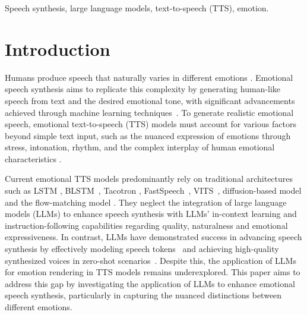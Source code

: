 \begin{IEEEkeywords}
Speech synthesis, large language models, text-to-speech (TTS), emotion.
\end{IEEEkeywords}
\vspace{-0.3cm}
\section{Introduction}
\vspace{-0.1cm}
Humans produce speech that naturally varies in different emotions \cite{yasuda2023text,chen2023vector,khanam2022text,nose2007style}.
Emotional speech synthesis aims to replicate this complexity by generating human-like speech from text and the desired emotional tone, with significant advancements achieved through machine learning techniques~\cite{zhou2022speech,diatlova2023emospeech,lee2017emotional,li2024mm}.
To generate realistic emotional speech, emotional text-to-speech (TTS) models must account for various factors beyond simple text input, such as the nuanced expression of emotions through stress, intonation, rhythm, and the complex interplay of human emotional characteristics \cite{nose2007style,wang2018style}.

Current emotional TTS models predominantly rely on traditional architectures such as LSTM \cite{lei2021fine}, BLSTM~\cite{liu2024emotion}, Tacotron \cite{li2021controllable,um2020emotional,li2024mm,wang2018style}, FastSpeech~\cite{kim2021expressive,diatlova2023emospeech,lee2017emotional,li2024mm,yang2024instructtts}, VITS~\cite{zhao2023emotion}, diffusion-based model \cite{guo2023emodiff} and the flow-matching model \cite{wu2024laugh}. They neglect the integration of large language models (LLMs) to enhance speech synthesis with LLMs' in-context learning and instruction-following capabilities regarding quality, naturalness and emotional expressiveness.
In contrast, LLMs have demonstrated success in advancing speech synthesis by effectively modeling speech tokens~\cite{kimclam} and achieving high-quality synthesized voices in zero-shot scenarios~\cite{du2024cosyvoice, wang2023neural}. 
Despite this, the application of LLMs for emotion rendering in TTS models remains underexplored. This paper aims to address this gap by investigating the application of LLMs to enhance emotional speech synthesis, particularly in capturing the nuanced distinctions between different emotions.

